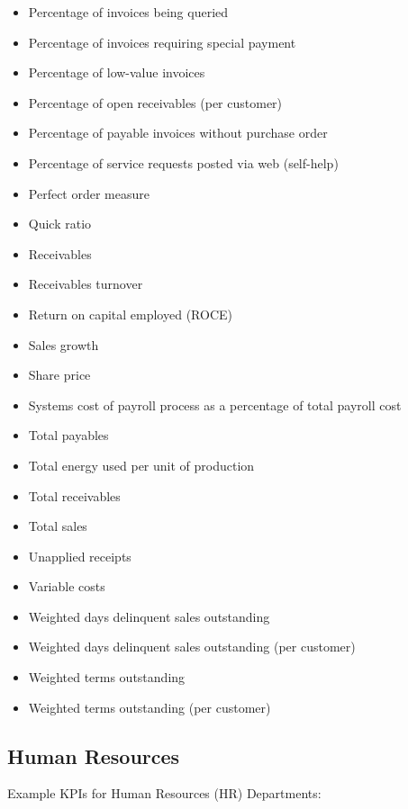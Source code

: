 \documentclass[]{book}
\begin{document}
\begin{itemize}
\item
  Percentage of invoices being queried
\item
  Percentage of invoices requiring special payment
\item
  Percentage of low-value invoices
\item
  Percentage of open receivables (per customer)
\item
  Percentage of payable invoices without purchase order
\item
  Percentage of service requests posted via web (self-help)
\item
  Perfect order measure
\item
  Quick ratio
\item
  Receivables
\item
  Receivables turnover
\item
  Return on capital employed (ROCE)
\item
  Sales growth
\item
  Share price
\item
  Systems cost of payroll process as a percentage of total payroll cost
\item
  Total payables
\item
  Total energy used per unit of production
\item
  Total receivables
\item
  Total sales
\item
  Unapplied receipts
\item
  Variable costs
\item
  Weighted days delinquent sales outstanding
\item
  Weighted days delinquent sales outstanding (per customer)
\item
  Weighted terms outstanding
\item
  Weighted terms outstanding (per customer)
\end{itemize}

\subsection{Human Resources}\label{human-resources}

Example KPIs for Human Resources (HR) Departments:
\end{document}
